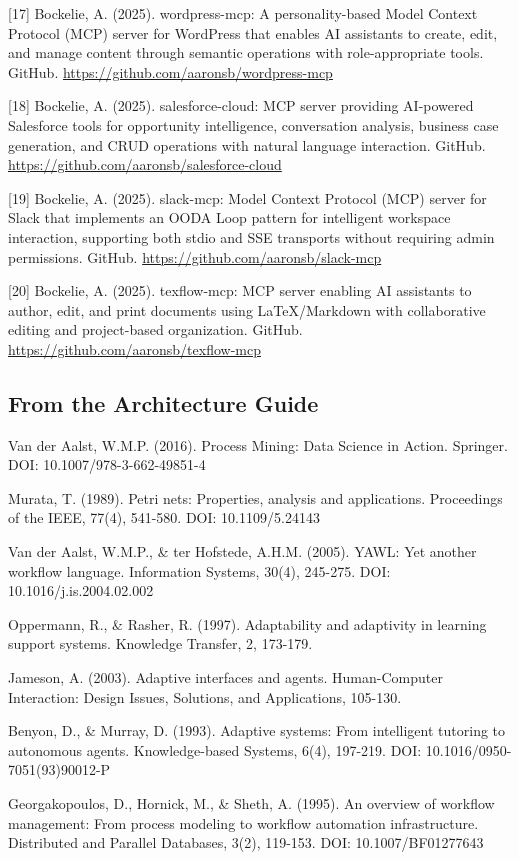 \documentclass[11pt,a4paper]{article}
\begin{document}
[17] Bockelie, A. (2025). wordpress-mcp: A personality-based Model Context Protocol (MCP) server for WordPress that enables AI assistants to create, edit, and manage content through semantic operations with role-appropriate tools. GitHub. \url{https://github.com/aaronsb/wordpress-mcp}

[18] Bockelie, A. (2025). salesforce-cloud: MCP server providing AI-powered Salesforce tools for opportunity intelligence, conversation analysis, business case generation, and CRUD operations with natural language interaction. GitHub. \url{https://github.com/aaronsb/salesforce-cloud}

[19] Bockelie, A. (2025). slack-mcp: Model Context Protocol (MCP) server for Slack that implements an OODA Loop pattern for intelligent workspace interaction, supporting both stdio and SSE transports without requiring admin permissions. GitHub. \url{https://github.com/aaronsb/slack-mcp}

[20] Bockelie, A. (2025). texflow-mcp: MCP server enabling AI assistants to author, edit, and print documents using LaTeX/Markdown with collaborative editing and project-based organization. GitHub. \url{https://github.com/aaronsb/texflow-mcp}

\subsection*{From the Architecture Guide}

Van der Aalst, W.M.P. (2016). Process Mining: Data Science in Action. Springer. DOI: 10.1007/978-3-662-49851-4

Murata, T. (1989). Petri nets: Properties, analysis and applications. Proceedings of the IEEE, 77(4), 541-580. DOI: 10.1109/5.24143

Van der Aalst, W.M.P., \& ter Hofstede, A.H.M. (2005). YAWL: Yet another workflow language. Information Systems, 30(4), 245-275. DOI: 10.1016/j.is.2004.02.002

Oppermann, R., \& Rasher, R. (1997). Adaptability and adaptivity in learning support systems. Knowledge Transfer, 2, 173-179.

Jameson, A. (2003). Adaptive interfaces and agents. Human-Computer Interaction: Design Issues, Solutions, and Applications, 105-130.

Benyon, D., \& Murray, D. (1993). Adaptive systems: From intelligent tutoring to autonomous agents. Knowledge-based Systems, 6(4), 197-219. DOI: 10.1016/0950-7051(93)90012-P

Georgakopoulos, D., Hornick, M., \& Sheth, A. (1995). An overview of workflow management: From process modeling to workflow automation infrastructure. Distributed and Parallel Databases, 3(2), 119-153. DOI: 10.1007/BF01277643
\end{document}
